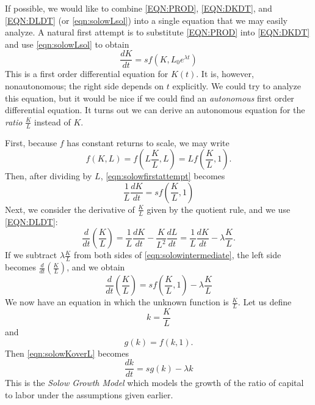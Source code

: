 \documentclass[reqno]{immbook}
\numberwithin{equation}{chapter}
\numberwithin{question}{section}
\numberwithin{theorem}{chapter}
\numberwithin{figure}{chapter}
\theoremstyle{definition}
\begin{document}
If possible, we would like to combine \eqref{EQN:PROD},
\eqref{EQN:DKDT}, and \eqref{EQN:DLDT} (or \eqref{eqn:solowLsol})
into a single
equation that we may easily analyze. A natural first
attempt is to substitute \eqref{EQN:PROD} into
\eqref{EQN:DKDT} and use \eqref{eqn:solowLsol} to obtain
\begin{equation}
  \frac{dK}{dt} = sf(K,L_0e^{\lambda t})
\label{eqn:solowfirstattempt}
\end{equation}
This is a first order differential equation for $K(t)$.
It is, however, nonautonomous; the right side depends on $t$ explicitly.
We could try to analyze this equation, but it would
be nice if we could find an \emph{autonomous} first order
differential equation.  It turns out we can derive an
autonomous equation for 
the \emph{ratio} $\frac{K}{L}$ instead of $K$.

First, because $f$ has constant returns to scale,
we may write
\begin{equation}
  f(K,L) = f\left(L\frac{K}{L},L\right) = Lf\left(\frac{K}{L},1\right).
\end{equation}
Then, after dividing by $L$, \eqref{eqn:solowfirstattempt} becomes
\begin{equation}
  \frac{1}{L}\frac{dK}{dt} = sf\left(\frac{K}{L},1\right)
\label{eqn:solowintermediate}
\end{equation}
Next, we consider the
derivative of $\frac{K}{L}$ given by the quotient rule,
and we use \eqref{EQN:DLDT}:
\begin{equation}
  \frac{d}{dt}\left(\frac{K}{L}\right)
    = \frac{1}{L}\frac{dK}{dt} - \frac{K}{L^2}\frac{dL}{dt}
    = \frac{1}{L}\frac{dK}{dt} - \lambda\frac{K}{L}.
\end{equation}
If we subtract $\lambda\frac{K}{L}$ from both sides of
\eqref{eqn:solowintermediate}, the left side becomes
$\frac{d}{dt}\left(\frac{K}{L}\right)$, and we obtain
\begin{equation}
  \frac{d}{dt}\left(\frac{K}{L}\right) =
    sf\left(\frac{K}{L},1\right) - \lambda\frac{K}{L}
\label{eqn:solowKoverL}
\end{equation}
We now have an equation in which the unknown function
is $\frac{K}{L}$.  Let us define
\begin{equation}
   k = \frac{K}{L}
\label{eqn:solowdefk}
\end{equation}
and
\begin{equation}
    g(k) = f(k,1).
\label{eqn:solowdefg}
\end{equation}
Then \eqref{eqn:solowKoverL} becomes
\begin{equation}
  \frac{dk}{dt} = s g(k) - \lambda k
\end{equation}
This is the \emph{Solow Growth Model} \cite{Solow}
which models the growth of the ratio of capital to labor
under the assumptions given earlier.
\end{document}
